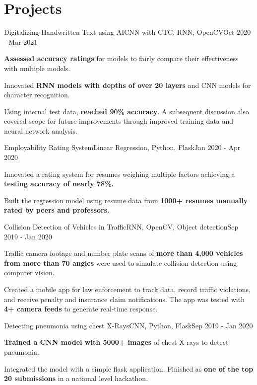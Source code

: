 \documentclass[letterpaper]{resume_config}
\begin{document}
\section{Projects}
\Project
    {Digitalizing Handwritten Text using AI}{CNN with CTC, RNN, OpenCV}{Oct 2020 - Mar 2021}
    {
        \item {\textbf{Assessed accuracy ratings} for models to fairly compare their effectiveness with multiple models.} \item {Innovated \textbf{RNN models with depths of over 20 layers} and CNN models for character recognition.}
        \item {Using internal test data, \textbf{reached 90\% accuracy}. A subsequent discussion also covered scope for future improvements through improved training data and neural network analysis.}
    }
\Project
    {Employability Rating System}{Linear Regression, Python, Flask}{Jan 2020 - Apr 2020}
    {
        \item {Innovated a rating system for resumes weighing multiple factors achieving a \textbf{testing accuracy of nearly 78\%.}}
        \item {Built the regression model using resume data from \textbf{1000+ resumes manually rated by peers and professors.}}
    }
\Project
    {Collision Detection of Vehicles in Traffic}{RNN, OpenCV, Object detection}{Sep 2019 - Jan 2020}
    {
        \item {Traffic camera footage and number plate scans of \textbf{more than 4,000 vehicles from more than 70 angles} were used to simulate collision detection using computer vision.}
        \item {Created a mobile app for law enforcement to track data, record traffic violations, and receive penalty and insurance claim notifications. The app was tested with \textbf{4+ camera feeds} to generate real-time response.}
    }
\Project
    {Detecting pneumonia using chest X-Rays}{CNN, Python, Flask}{Sep 2019 - Jan 2020}
    {
        \item{\textbf{Trained a CNN model with 5000+ images} of chest X-rays to detect pneumonia.}
        \item{Integrated the model with a simple flask application. Finished as \textbf{one of the top 20 submissions} in a national level hackathon.}
    }
\vspace{-5pt}
\end{document}
